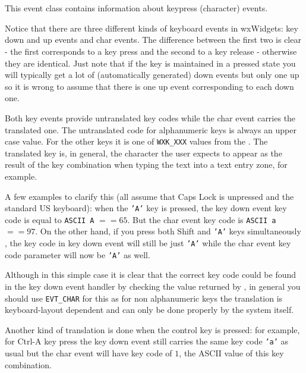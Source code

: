 \section{}\label{wxkeyevent}

This event class contains information about keypress (character) events.

Notice that there are three different kinds of keyboard events in wxWidgets:
key down and up events and char events. The difference between the first two
is clear - the first corresponds to a key press and the second to a key
release - otherwise they are identical. Just note that if the key is
maintained in a pressed state you will typically get a lot of (automatically
generated) down events but only one up so it is wrong to assume that there is
one up event corresponding to each down one.

Both key events provide untranslated key codes while the char event carries
the translated one. The untranslated code for alphanumeric keys is always
an upper case value. For the other keys it is one of {\tt WXK\_XXX} values
from the . The translated key is, in
general, the character the user expects to appear as the result of the key
combination when typing the text into a text entry zone, for example.

A few examples to clarify this (all assume that {\sc Caps Lock} is unpressed
and the standard US keyboard): when the {\tt 'A'} key is pressed, the key down
event key code is equal to {\tt ASCII A} $== 65$. But the char event key code
is {\tt ASCII a} $== 97$. On the other hand, if you press both {\sc Shift} and
{\tt 'A'} keys simultaneously , the key code in key down event will still be
just {\tt 'A'} while the char event key code parameter will now be {\tt 'A'}
as well.

Although in this simple case it is clear that the correct key code could be
found in the key down event handler by checking the value returned by
, in general you should use
{\tt EVT\_CHAR} for this as for non alphanumeric keys the translation is
keyboard-layout dependent and can only be done properly by the system itself.

Another kind of translation is done when the control key is pressed: for
example, for {\sc Ctrl-A} key press the key down event still carries the
same key code {\tt 'a'} as usual but the char event will have key code of
$1$, the ASCII value of this key combination.

